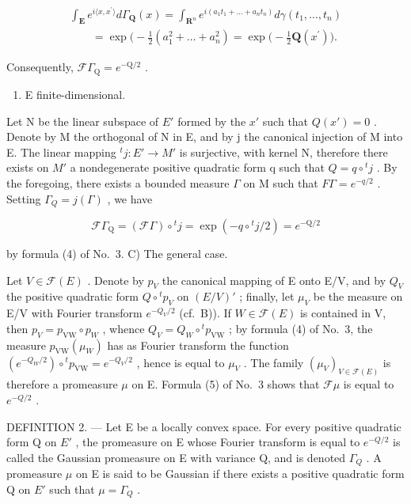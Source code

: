 \[
\begin{array}{l} \int_ {\mathbf {E}} e ^ {i \langle x, x ^ {\prime} \rangle} d \Gamma_ {\mathbf {Q}} (x) = \int_ {\mathbf {R} ^ {n}} e ^ {i (a _ {1} t _ {1} + \dots + a _ {n} t _ {n})} d \gamma (t _ {1}, \ldots , t _ {n}) \\ \qquad = \exp \big (- \frac {1}{2} (a _ {1} ^ {2} + \dots + a _ {n} ^ {2}) = \exp \big (- \frac {1}{2} \mathbf {Q} (x ^ {\prime}) \big). \end{array}
\]

Consequently, \(\mathcal{F}\Gamma_{\mathrm{Q}} = e^{-\mathrm{Q} / 2}\) .

\begin{enumerate}
\def\labelenumi{\Alph{enumi})}
\setcounter{enumi}{1}
\tightlist
\item
  E finite-dimensional.
\end{enumerate}

Let N be the linear subspace of \(E'\) formed by the \(x'\) such that \(Q(x') = 0\) . Denote by M the orthogonal of N in E, and by j the canonical injection of M into E. The linear mapping \({}^{t}j : E' \to M'\) is surjective, with kernel N, therefore there exists on \(M'\) a nondegenerate positive quadratic form q such that \(Q = q \circ {}^{t}j\) . By the foregoing, there exists a bounded measure \(\Gamma\) on M such that \(F\Gamma = e^{-q/2}\) . Setting \(\Gamma_{Q} = j(\Gamma)\) , we have

\[
\mathcal {F} \Gamma_ {\mathrm{Q}} = (\mathcal {F} \Gamma) \circ {} ^ {t} j = \exp (- q \circ {} ^ {t} j / 2) = e ^ {- \mathrm{Q} / 2}
\]

by formula (4) of No.~3.
\relax{}
C) The general case.

Let \(V \in \mathcal{F}(E)\) . Denote by \(p_V\) the canonical mapping of E onto E/V, and by \(Q_V\) the positive quadratic form \(Q \circ {}^t p_V\) on \((E/V)'\) ; finally, let \(\mu_V\) be the measure on E/V with Fourier transform \(e^{-Q_V/2}\) (cf.~B)). If \(W \in \mathcal{F}(E)\) is contained in V, then \(p_V = p_{\text{VW}} \circ p_W\) , whence \(Q_V = Q_W \circ {}^t p_{\text{VW}}\) ; by formula (4) of No.~3, the measure \(p_{\text{VW}}(\mu_W)\) has as Fourier transform the function \((e^{-Q_W/2}) \circ {}^t p_{\text{VW}} = e^{-Q_V/2}\) , hence is equal to \(\mu_V\) . The family \((\mu_V)_{V \in \mathcal{F}(E)}\) is therefore a promeasure \(\mu\) on E. Formula (5) of No.~3 shows that \(\mathcal{F}\mu\) is equal to \(e^{-Q/2}\) .

DEFINITION 2. --- Let E be a locally convex space. For every positive quadratic form Q on \(E'\) , the promeasure on E whose Fourier transform is equal to \(e^{-Q/2}\) is called the Gaussian promeasure on E with variance Q, and is denoted \(\Gamma_{Q}\) . A promeasure \(\mu\) on E is said to be Gaussian if there exists a positive quadratic form Q on \(E'\) such that \(\mu = \Gamma_{Q}\) .

